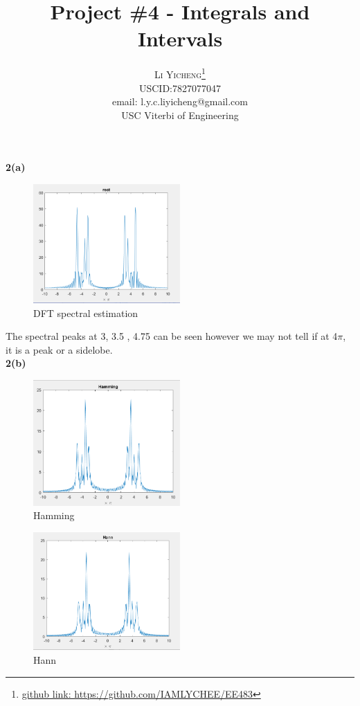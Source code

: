 \documentclass[twoside]{article}
\title{\vspace{-15mm}\fontsize{24pt}{10pt}\selectfont\textbf{Project \#4 - Integrals and Intervals }} %
\author{
\large
\textsc{Li Yicheng}\thanks{\href{https://github.com/IAMLYCHEE/EE483}{github link: https://github.com/IAMLYCHEE/EE483} }\\[2mm] %
\normalsize USCID:7827077047\\
\normalsize email: l.y.c.liyicheng@gmail.com \\ %
\normalsize USC Viterbi of Engineering
\vspace{-5mm}
}
\date{}
\begin{document}
\maketitle %

\thispagestyle{fancy} %
\noindent \textbf {2(a)}\\
\begin{figure}[H]
   \centering
   \includegraphics[width = 0.5\textwidth]{./data/rect.png}  
   \caption{DFT spectral estimation}
\end{figure}
The spectral peaks at 3, 3.5 , 4.75 can be seen however we may not tell if at 4$\pi$, it is a peak or a sidelobe.\\
\noindent \textbf {2(b)}\\
\begin{figure}[H]
   \centering
   \includegraphics[width = 0.5\textwidth]{./data/hamming.png}  
   \caption{Hamming}
\end{figure}
\begin{figure}[H]
   \centering
   \includegraphics[width = 0.5\textwidth]{./data/hann.png}  
   \caption{Hann}
\end{figure}
\end{document}
